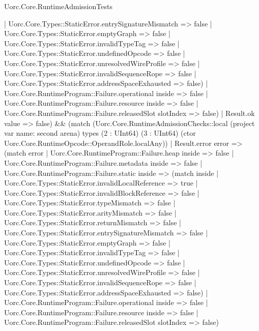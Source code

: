 \begin{lexlean}{Uorc.Core.RuntimeAdmissionTests}
\begin{semanticmodule}
{{{{{                        | Uorc.Core.Types::StaticError.entrySignatureMismatch => false
                        | Uorc.Core.Types::StaticError.emptyGraph => false
                        | Uorc.Core.Types::StaticError.invalidTypeTag => false
                        | Uorc.Core.Types::StaticError.undefinedOpcode => false
                        | Uorc.Core.Types::StaticError.unresolvedWireProfile => false
                        | Uorc.Core.Types::StaticError.invalidSequenceRope => false
                        | Uorc.Core.Types::StaticError.addressSpaceExhausted => false)
                      | Uorc.Core.RuntimeProgram::Failure.operational inside => false
                      | Uorc.Core.RuntimeProgram::Failure.resource inside => false
                      | Uorc.Core.RuntimeProgram::Failure.releasedSlot slotIndex => false)
                    | Result.ok value => false) && (match (Uorc.Core.RuntimeAdmissionChecks::local (project var{
                      name: second
                    } arena) types (2 : UInt64) (3 : UInt64) (ctor Uorc.Core.RuntimeOpcode::OperandRole.localAny))
                    | Result.error error => (match error
                      | Uorc.Core.RuntimeProgram::Failure.heap inside => false
                      | Uorc.Core.RuntimeProgram::Failure.metadata inside => false
                      | Uorc.Core.RuntimeProgram::Failure.static inside => (match inside
                        | Uorc.Core.Types::StaticError.invalidLocalReference => true
                        | Uorc.Core.Types::StaticError.invalidBlockReference => false
                        | Uorc.Core.Types::StaticError.typeMismatch => false
                        | Uorc.Core.Types::StaticError.arityMismatch => false
                        | Uorc.Core.Types::StaticError.returnMismatch => false
                        | Uorc.Core.Types::StaticError.entrySignatureMismatch => false
                        | Uorc.Core.Types::StaticError.emptyGraph => false
                        | Uorc.Core.Types::StaticError.invalidTypeTag => false
                        | Uorc.Core.Types::StaticError.undefinedOpcode => false
                        | Uorc.Core.Types::StaticError.unresolvedWireProfile => false
                        | Uorc.Core.Types::StaticError.invalidSequenceRope => false
                        | Uorc.Core.Types::StaticError.addressSpaceExhausted => false)
                      | Uorc.Core.RuntimeProgram::Failure.operational inside => false
                      | Uorc.Core.RuntimeProgram::Failure.resource inside => false
                      | Uorc.Core.RuntimeProgram::Failure.releasedSlot slotIndex => false)
}}}}}
\end{semanticmodule}
\end{lexlean}
